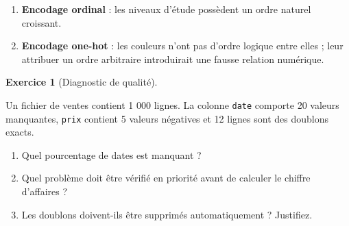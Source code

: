 \documentclass[
  french,
  letterpaper,
  open=any]{scrbook}
\providecommand{\tightlist}{%
  \setlength{\itemsep}{0pt}\setlength{\parskip}{0pt}}
\theoremstyle{definition}
\theoremstyle{definition}
\newtheorem{exercise}{Exercice}[section]
\theoremstyle{remark}
\begin{document}
\begin{tcolorbox}[enhanced jigsaw, arc=.35mm, bottomrule=.15mm, bottomtitle=1mm, breakable, colback=white, colbacktitle=quarto-callout-tip-color!10!white, colframe=quarto-callout-tip-color-frame, coltitle=black, left=2mm, leftrule=.75mm, opacityback=0, opacitybacktitle=0.6, rightrule=.15mm, title=\textcolor{quarto-callout-tip-color}{\faLightbulb}\hspace{0.5em}{Solution de l'exercice Exercice~\ref{exr-prep-3}}, titlerule=0mm, toprule=.15mm, toptitle=1mm]

\begin{enumerate}
\def\labelenumi{\alph{enumi}.}
\tightlist
\item
  \textbf{Encodage ordinal} : les niveaux d'étude possèdent un ordre
  naturel croissant.
\item
  \textbf{Encodage one-hot} : les couleurs n'ont pas d'ordre logique
  entre elles ; leur attribuer un ordre arbitraire introduirait une
  fausse relation numérique.
\end{enumerate}

\end{tcolorbox}

\begin{exercise}[Diagnostic de
qualité]\protect\hypertarget{exr-prep-4}{}\label{exr-prep-4}

Un fichier de ventes contient 1 000 lignes. La colonne \texttt{date}
comporte 20 valeurs manquantes, \texttt{prix} contient 5 valeurs
négatives et 12 lignes sont des doublons exacts.

\begin{enumerate}
\def\labelenumi{\alph{enumi}.}
\tightlist
\item
  Quel pourcentage de dates est manquant ?
\item
  Quel problème doit être vérifié en priorité avant de calculer le
  chiffre d'affaires ?
\item
  Les doublons doivent-ils être supprimés automatiquement ? Justifiez.
\end{enumerate}

\end{exercise}
\end{document}
